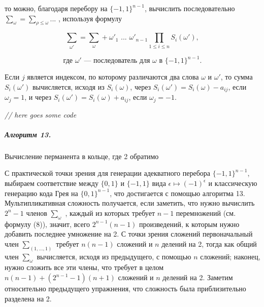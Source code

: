 \documentclass{../../template/mai_book}
\begin{document}
\pagebreak


\noindent
то можно, благодаря перебору на $\{-1, 1\}^{n - 1}$, вычислить последовательно ${\sum}_\omega = {\sum}_{\rho \leq \omega}$... , используя формулу

\begin{equation*}
{\sum}_{\omega'} = {\sum}_\omega + {\omega'}_1 \text{ ... } {\omega'}_{n - 1} \prod_{1 \leq i \leq n} S_i(\omega'),
\end{equation*}

\begin{equation}
\text{где } \omega' \text{ — последователь для } \omega \text{ в } \{-1, 1\}^{n - 1}.
\end{equation}

\noindent
Если $j$ является индексом, по которому различаются два слова $\omega$ и $\omega'$, то сумма $S_i(\omega')$ вычисляется, исходя из $S_i(\omega)$, через $S_i(\omega') = S_i(\omega) - a_{ij}$, если $\omega_j = 1$, и через $S_i(\omega') = S_i(\omega) + a_{ij}$, если $\omega_j = -1$. \newline

\textit{// here goes some code}

\subparagraph{Алгоритм 13.} Вычисление перманента в кольце, где 2 обратимо \newline

С практической точки зрения для генерации адекватного перебора \linebreak $\{-1, 1\}^{n - 1}$, выбираем соответствие между $\{0, 1\}$ и $\{-1, 1\}$ вида $\epsilon \mapsto (-1)^\epsilon$ и классическую генерацию кода Грея на $\{0, 1\}^{n - 1}$, что достигается с помощью алгоритма 13. Мультипликативная сложность получается, если заметить, что нужно вычислить $2^n - 1$ членов ${\sum}_\omega$ , каждый из которых требует $n - 1$ перемножений (см. формулу (8)), значит, всего $2^{n - 1}(n - 1)$ произведений, к которым нужно добавить последнее умножение на 2. С точки зрения сложений первоначальный член ${\sum}_{(1,...,1)}$ требует $n(n - 1)$ сложений и $n$ делений на 2, тогда как общий член ${\sum}_\omega$ вычисляется, исходя из предыдущего, с помощью $n$ сложений; наконец, нужно сложить все эти члены, что требует в целом $n(n - 1) + (2^{n - 1} - 1)(n + 1)$ сложений и $n$ делений на 2. Заметим относительно предыдущего упражнения, что сложность была приблизительно разделена на 2.

\pagebreak

\end{document}
